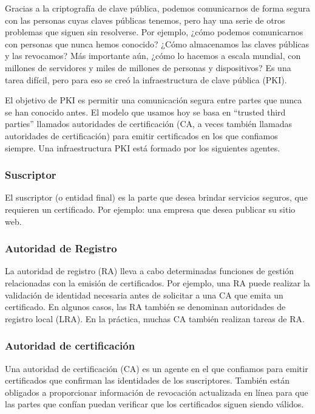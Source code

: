 
Gracias a la criptografía de clave pública, podemos comunicarnos de forma segura con 
las personas cuyas claves públicas tenemos, pero hay una serie de otros problemas 
que siguen sin resolverse. Por ejemplo, ¿cómo podemos comunicarnos con personas que 
nunca hemos conocido? ¿Cómo almacenamos las claves públicas y las revocamos? Más 
importante aún, ¿cómo lo hacemos a escala mundial, con millones de servidores y 
miles de millones de personas y dispositivos? Es una tarea difícil, pero para eso 
se creó la infraestructura de clave pública (PKI).

El objetivo de PKI es permitir una comunicación segura entre partes que nunca se 
han conocido antes. El modelo que usamos hoy se basa en “trusted third parties” 
llamados autoridades de certificación (CA, a veces también llamadas autoridades 
de certificación) para emitir certificados en los que confiamos siempre. Una 
infraestructura PKI está formado por los siguientes agentes.


\subsubsection*{Suscriptor}


El suscriptor (o entidad final) es la parte que desea brindar servicios 
seguros, que requieren un certificado. Por ejemplo: una empresa que desea 
publicar su sitio web.

\subsubsection*{Autoridad de Registro}

La autoridad de registro (RA) lleva a cabo determinadas funciones de gestión 
relacionadas con la emisión de certificados. Por ejemplo, una RA puede realizar 
la validación de identidad necesaria antes de solicitar a una CA que emita un 
certificado. En algunos casos, las RA también se denominan autoridades de 
registro local (LRA). En la práctica, muchas CA también realizan tareas de RA.

\subsubsection*{Autoridad de certificación}

Una autoridad de certificación (CA) es un agente en el que confiamos para emitir 
certificados que confirman las identidades de los suscriptores. También están 
obligados a proporcionar información de revocación actualizada en línea para 
que las partes que confían puedan verificar que los certificados siguen siendo válidos.

